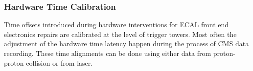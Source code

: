 \subsubsection{Hardware Time Calibration}
Time offsets introduced during hardware interventions for ECAL front end electronics repairs are calibrated at the level of trigger towers. Most often the adjustment of the hardware time latency happen during the process of CMS data recording. These time alignments can be done using either data from proton-proton collision or from laser. 
